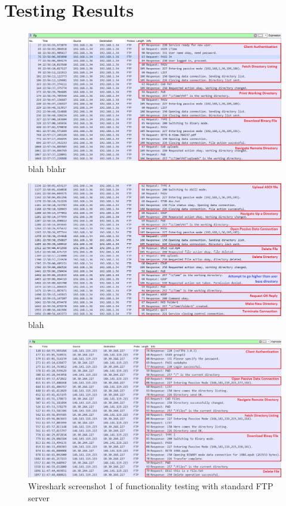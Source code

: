 \documentclass[10pt,twocolumn]{witseiepaper}
\begin{document}
\begin{appendix}
\begin{tabular}{|l|l|l|}
\end{tabular} 


\section{Testing Results}\label{sec:wireshark}

\begin{figure}[h]
	\centering
	\includegraphics[width=0.9\columnwidth]{ClientServer1anno.png}
	\caption{blah blahr}
	\raggedright
	\label{fig:ourWS1}
\end{figure}

\begin{figure}[h]
	\centering
	\includegraphics[width=0.9\columnwidth]{ClientServer2anno.png}
	\caption{blah}
	\raggedright
	\label{fig:ourWS2}
\end{figure}

\begin{figure}[h]
	\centering
	\includegraphics[width=0.9\columnwidth]{WitsCaptureAnno2.png}
	\caption{Wireshark screenshot 1 of functionality testing with standard FTP server}
	\raggedright
	\label{fig:WitsWS1}
\end{figure}


\end{appendix}
\end{document}
